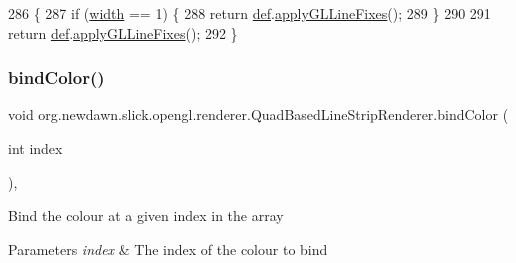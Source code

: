 \begin{DoxyCode}
286                                       \{
287         \textcolor{keywordflow}{if} (\mbox{\hyperlink{classorg_1_1newdawn_1_1slick_1_1opengl_1_1renderer_1_1_quad_based_line_strip_renderer_a2ea1970be2e402b69b69f7cefbf41c52}{width}} == 1) \{
288             \textcolor{keywordflow}{return} \mbox{\hyperlink{classorg_1_1newdawn_1_1slick_1_1opengl_1_1renderer_1_1_quad_based_line_strip_renderer_ace068cf3ac38fc9ef4a9025096fb3279}{def}}.\mbox{\hyperlink{classorg_1_1newdawn_1_1slick_1_1opengl_1_1renderer_1_1_default_line_strip_renderer_ab8658df4f3b6dfae473b3c708dadfdfb}{applyGLLineFixes}}();
289         \}
290         
291         \textcolor{keywordflow}{return} \mbox{\hyperlink{classorg_1_1newdawn_1_1slick_1_1opengl_1_1renderer_1_1_quad_based_line_strip_renderer_ace068cf3ac38fc9ef4a9025096fb3279}{def}}.\mbox{\hyperlink{classorg_1_1newdawn_1_1slick_1_1opengl_1_1renderer_1_1_default_line_strip_renderer_ab8658df4f3b6dfae473b3c708dadfdfb}{applyGLLineFixes}}();
292     \}
\end{DoxyCode}
\mbox{\label{classorg_1_1newdawn_1_1slick_1_1opengl_1_1renderer_1_1_quad_based_line_strip_renderer_a4c1f3c2faa11f9c27467a12b9949143b}} 
\subsubsection{\texorpdfstring{bind\+Color()}{bindColor()}}
{\footnotesize\ttfamily void org.\+newdawn.\+slick.\+opengl.\+renderer.\+Quad\+Based\+Line\+Strip\+Renderer.\+bind\+Color (\begin{DoxyParamCaption}\item[{int}]{index }\end{DoxyParamCaption})\hspace{0.3cm}{\ttfamily [inline]}, {\ttfamily [private]}}

Bind the colour at a given index in the array


\begin{DoxyParams}{Parameters}
{\em index} & The index of the colour to bind \\
\hline
\end{DoxyParams}

